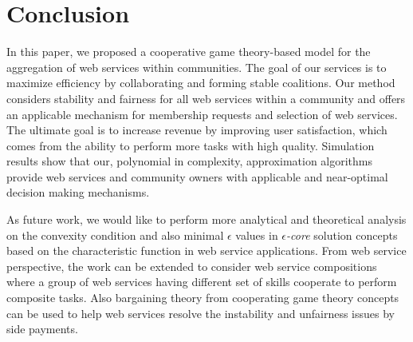 \documentclass[10pt,journal,cspaper,compsoc]{IEEEtran}
\begin{document}
\section{Conclusion}\label{s:conclusion}

In this paper, we proposed a cooperative game theory-based model
for the aggregation of web services within communities. The goal
of our services is to maximize efficiency by collaborating and
forming stable coalitions. Our method considers stability and
fairness for all web services within a community and offers an
applicable mechanism for membership requests and selection of web
services. The ultimate goal is to increase revenue by improving
user satisfaction, which comes from the ability to perform more
tasks with high quality. Simulation results show that our,
polynomial in complexity, approximation algorithms provide web
services and community owners with applicable and near-optimal
decision making mechanisms.

As future work, we would like to perform more analytical and
theoretical analysis on the convexity condition and also minimal $\epsilon$ values in \emph{$\epsilon$-core} solution concepts based on the
characteristic function in web service applications. From web service perspective, the
work can be extended to consider web service compositions where a
group of web services having different set of skills cooperate to
perform composite tasks. Also bargaining theory from cooperating
game theory concepts can be used to help web services resolve the
instability and unfairness issues by side payments.






%
\end{document}
